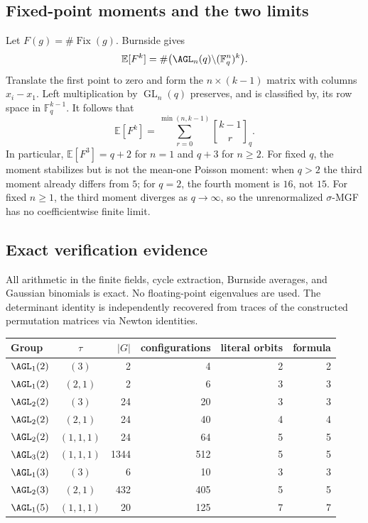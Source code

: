 \documentclass[10pt]{article}
\newcommand{\Fix}{\operatorname{Fix}}
\newcommand{\F}{\mathbb F}
\newcommand{\GL}{\operatorname{GL}}
\begin{document}
\subsection{Fixed-point moments and the two limits}
Let $F(g)=\#\Fix(g)$.  Burnside gives
\[
 \mathbb E[F^k]=\#\bigl(\AGL_n(q)\backslash(\F_q^n)^k\bigr).
\]
Translate the first point to zero and form the $n\times(k-1)$ matrix with
columns $x_i-x_1$.  Left multiplication by $\GL_n(q)$ preserves, and is
classified by, its row space in $\F_q^{k-1}$.  It follows that
\begin{equation}\label{affine-groups-proof-and-verification:eq:moments}
 \boxed{\mathbb E[F^k]=\sum_{r=0}^{\min(n,k-1)}
 \genfrac{[}{]}{0pt}{}{k-1}{r}_q.}
\end{equation}
In particular, $\mathbb E[F^3]=q+2$ for $n=1$ and $q+3$ for $n\ge2$.
For fixed $q$, the moment stabilizes but is not the mean-one Poisson moment:
when $q>2$ the third moment already differs from $5$; for $q=2$, the fourth
moment is $16$, not $15$.  For fixed $n\ge1$, the third moment diverges as
$q\to\infty$, so the unrenormalized $\sigma$-MGF has no
coefficientwise finite limit.

\subsection{Exact verification evidence}
All arithmetic in the finite fields, cycle extraction, Burnside averages,
and Gaussian binomials is exact.  No floating-point eigenvalues are used.
The determinant identity is independently recovered from traces of the
constructed permutation matrices via Newton identities.

\begin{center}
\small
\begin{tabular}{@{}lcrrrr@{}}
\toprule
Group & $\tau$ & $|G|$ & configurations & literal orbits & formula\\
\midrule
$\AGL_1(2)$ & $(3)$ & 2 & 4 & 2 & 2\\
$\AGL_1(2)$ & $(2,1)$ & 2 & 6 & 3 & 3\\
$\AGL_2(2)$ & $(3)$ & 24 & 20 & 3 & 3\\
$\AGL_2(2)$ & $(2,1)$ & 24 & 40 & 4 & 4\\
$\AGL_2(2)$ & $(1,1,1)$ & 24 & 64 & 5 & 5\\
$\AGL_3(2)$ & $(1,1,1)$ & 1344 & 512 & 5 & 5\\
$\AGL_1(3)$ & $(3)$ & 6 & 10 & 3 & 3\\
$\AGL_2(3)$ & $(2,1)$ & 432 & 405 & 5 & 5\\
$\AGL_1(5)$ & $(1,1,1)$ & 20 & 125 & 7 & 7\\
\bottomrule
\end{tabular}
\end{center}
\end{document}
